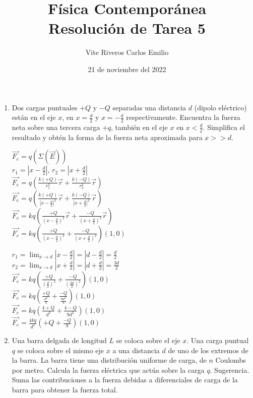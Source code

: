 \documentclass[10pt, a4paper]{article}
\title{Física Contemporánea\\Resolución de Tarea 5}
\author{Vite Riveros Carlos Emilio}
\date{21 de noviembre del 2022}
\begin{document}
    \maketitle

    \begin{enumerate}
        \item Dos cargas puntuales $+Q$ y $-Q$ separadas una distancia $d$ (dipolo eléctrico)
        están en el eje $x$, en $x = \frac{d}{2}$ y $x=-\frac{d}{2}$ respectivamente. Encuentra 
        la fuerza neta sobre una tercera carga $+q$, también en el eje $x$ en $x <\frac{d}{2}$.
        Simplifica el resultado y obtén la forma de la fuerza neta aproximada para $x >> d$.

        \begin{center}
            $\vec{F_e}=q(\Sigma(\vec{E}))$\\
            $r_1 = |x-\frac{d}{2}|$, $r_2 = |x+\frac{d}{2}|$\\
            $\vec{F_e}=q(\frac{k(+Q)}{r_1^2}\vec{r}+\frac{k(-Q)}{r_2^2}\vec{r})$\\
            $\vec{F_e}=q(\frac{k(+Q)}{|x-\frac{d}{2}|^2}\vec{r}+\frac{k(-Q)}{|x+\frac{d}{2}|^2}\vec{r})$\\
            $\vec{F_e}=kq(\frac{+Q}{(x-\frac{d}{2})^2}\vec{r}+\frac{-Q}{(x+\frac{d}{2})^2}\vec{r})$\\
            $\vec{F_e}=kq(\frac{+Q}{(x-\frac{d}{2})^2}+\frac{-Q}{(x+\frac{d}{2})^2})(1, 0)$

            $r_1 = \lim_{x\to d}|x-\frac{d}{2}|=|d-\frac{d}{2}|=\frac{d}{2}$\\
            $r_2 = \lim_{x\to d}|x+\frac{d}{2}|=|d+\frac{d}{2}|=\frac{3d}{2}$\\
            $\vec{F_e}=kq(\frac{+Q}{(\frac{d}{2})^2}+\frac{-Q}{(\frac{3d}{2})^2})(1, 0)$\\
            $\vec{F_e}=kq(\frac{+Q}{\frac{d^2}{4}}+\frac{-Q}{\frac{9d^2}{4}})(1, 0)$\\
            $\vec{F_e}=kq(\frac{4+Q}{d^2}+\frac{4-Q}{9d^2})(1, 0)$\\
            $\vec{F_e}=\frac{4kq}{d^2}(+Q+\frac{-Q}{9})(1, 0)$\\

        \end{center}

        \item Una barra delgada de longitud $L$ se coloca sobre el eje $x$. Una carga puntual
        $q$ se coloca sobre el mismo eje $x$ a una distancia $d$ de uno de los extremos de
        la barra. La barra tiene una distribución uniforme de carga, de $n$ Coulombs
        por metro. Calcula la fuerza eléctrica que actúa sobre la carga $q$.
        Sugerencia. Suma las contribuciones a la fuerza debidas a diferenciales de
        carga de la barra para obtener la fuerza total.


\end{enumerate}
\end{document}
